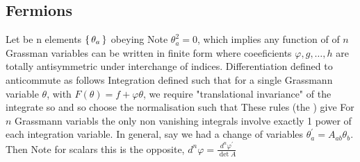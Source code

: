 \documentclass{article}
\begin{document}
\subsection{Fermions}
Let  be n elements $\set{\theta_a}$ obeying 
Note $\theta_a^2 = 0$, which implies any function of of $n$ Grassman variables can be written in finite form 
where coeeficients $\varphi,g,\dots,h$ are totally antisymmetric under interchange of indices. Differentiation defined to anticommute as follows 
Integration defined such that for a single Grassmann variable $\theta$, with $F(\theta) = f + \varphi \theta$, we require "translational invariance" of the integrate so 
and so choose the normalisation such that 
These rules (the ) give 
For $n$ Grassmann variabls the only non vanishing integrals involve exactly 1 power of each integration variable. 
In general, 
say we had a change of variables $\theta_a^\prime = A_{ab} \theta_b$. Then 
Note for scalars this is the opposite, $d^n\varphi = \frac{d^n\varphi^\prime}{\det A }$

\end{document}
